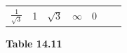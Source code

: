 {{\begin{center}
\begin{tabular}[t]{|l|l|l|l|l|l|l|}
                  \begin{math}\frac{1}{\sqrt{3}}\end{math}
                 &
    
    
        1 &
    
    
        
                  \begin{math}\sqrt{3}\end{math}
                 &
    
    
        
                  \begin{math}\infty \end{math}
                 &
    
    
        0%
     \tabularnewline\cline{1-1}\cline{2-2}\cline{3-3}\cline{4-4}\cline{5-5}\cline{6-6}\cline{7-7}
    \end{tabular}
      \end{center}
    \begin{center}{\small\bfseries Table 14.11}\end{center}
    
    \addtocounter{footnote}{-0}
    
          }{ %
        
    
}}

